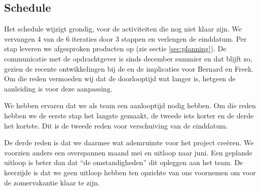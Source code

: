 
\begin{landscape}
\section{Schedule}




\begin{aanpassing1}
	Het schedule wijzigt grondig, voor de activiteiten die nog niet klaar zijn. 
	We vervangen 4 van de 6 iteraties door 3 stappen en verlengen de einddatum. Per 
	stap leveren we afgesproken producten op (zie sectie \ref{sec:planning}).
	De communicatie met de opdrachtgever is sinds december summier en dat blijft zo,
	gezien de recente ontwikkelingen bij de \ou en de implicaties voor Bernard 
	en Freek. Om die reden vermoeden wij dat de doorlooptijd wat langer is, hetgeen 
	de aanleiding is voor deze aanpassing.
	
	We hebben ervaren dat we als team een aanlooptijd nodig hebben.
	Om die reden hebben we de eerste stap het langste gemaakt, de tweede iets korter 
	en de derde het kortste. Dit is de tweede reden voor verschuiving van de einddatum.
	
	De derde reden is dat we daarmee wat ademruimte voor het project cre\"{e}ren. 
	We voorzien anders een overspannen maand mei en uitloop naar juni. 
	Een geplande uitloop is beter dan dat ``de omstandigheden''
	dit opleggen aan het team. De keerzijde is dat we geen uitloop hebben ten
	opzichte van ons voornemen om voor de zomervakantie klaar te zijn.
\end{aanpassing1}





\end{landscape}
